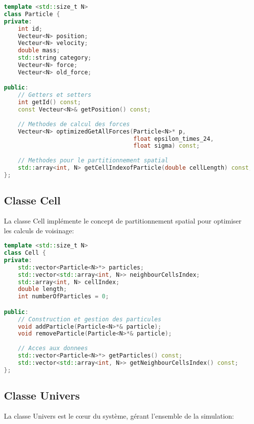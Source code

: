 \documentclass[12pt,a4paper]{article}
\begin{document}
\begin{lstlisting}[language=C++, caption=Extrait de la classe Particle]
template <std::size_t N>
class Particle {
private:
    int id;
    Vecteur<N> position;
    Vecteur<N> velocity;
    double mass;
    std::string category;
    Vecteur<N> force;
    Vecteur<N> old_force;

public:
    // Getters et setters
    int getId() const;
    const Vecteur<N>& getPosition() const;
    
    // Methodes de calcul des forces
    Vecteur<N> optimizedGetAllForces(Particle<N>* p, 
                                     float epsilon_times_24,
                                     float sigma) const;
    
    // Methodes pour le partitionnement spatial
    std::array<int, N> getCellIndexofParticle(double cellLength) const;
};
\end{lstlisting}

\subsection{Classe Cell}

La classe Cell implémente le concept de partitionnement spatial pour optimiser les calculs de voisinage:

\begin{lstlisting}[language=C++, caption=Extrait de la classe Cell]
template <std::size_t N>
class Cell {
private:
    std::vector<Particle<N>*> particles;
    std::vector<std::array<int, N>> neighbourCellsIndex;
    std::array<int, N> cellIndex;
    double length;
    int numberOfParticles = 0;

public:
    // Construction et gestion des particules
    void addParticle(Particle<N>*& particle);
    void removeParticle(Particle<N>*& particle);
    
    // Acces aux donnees
    std::vector<Particle<N>*> getParticles() const;
    std::vector<std::array<int, N>> getNeighbourCellsIndex() const;
};
\end{lstlisting}

\subsection{Classe Univers}

La classe Univers est le cœur du système, gérant l'ensemble de la simulation:
\end{document}
